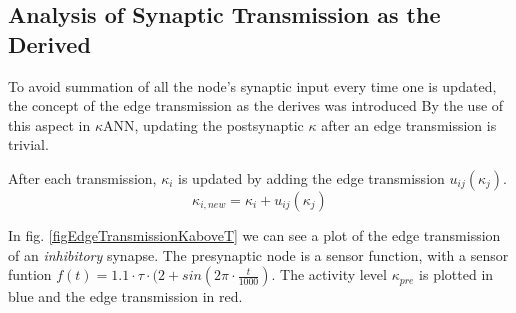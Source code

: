 	\subsection{Analysis of Synaptic Transmission as the Derived}
			\label{ssecAnalysisOfSynTransAsTheDerived}
			To avoid summation of all the node's synaptic input every time one is updated, the concept of the edge transmission as the derives was introduced
			By the use of this aspect in $\kappa$ANN, updating the postsynaptic $\kappa$ after an edge transmission is trivial.
	
			After each transmission, $\kappa_i$ is updated by adding the edge transmission $u_{ij}(\kappa_j)$. 	 	 %
			\begin{equation}
				\kappa_{i, new} = \kappa_{i} + u_{ij}(\kappa_j)
			\end{equation}
			
			
			
			In fig. \ref{figEdgeTransmissionKaboveT} we can see a plot of the edge transmission of an \emph{inhibitory} synapse.
			The presynaptic node is a sensor function, with a sensor funtion \mbox{$f(t) = 1.1 \cdot \tau \cdot (2 + sin( 2\pi \cdot \frac{t}{1000})$}.
			The activity level $\kappa_{pre}$ is plotted in blue and the edge transmission in red.
	
